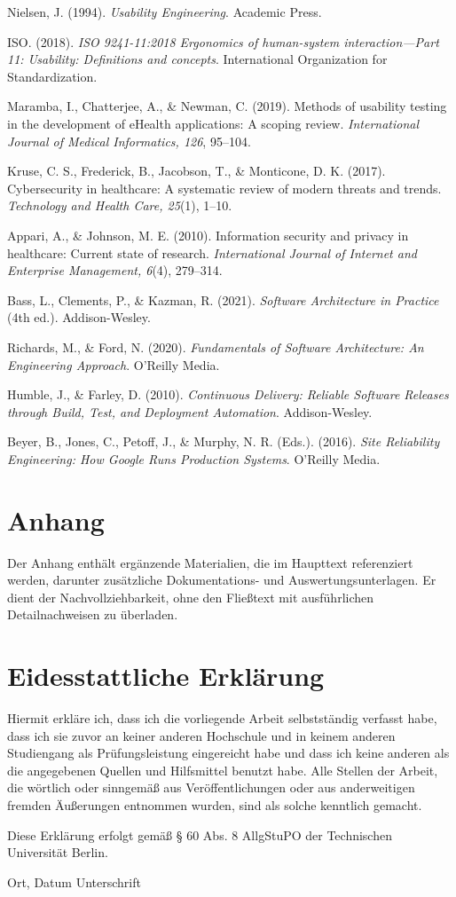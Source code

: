 Nielsen, J. (1994). \emph{Usability Engineering}. Academic Press.

ISO. (2018). \emph{ISO 9241-11:2018 Ergonomics of human-system
interaction---Part 11: Usability: Definitions and concepts}. International
Organization for Standardization.

Maramba, I., Chatterjee, A., \& Newman, C. (2019). Methods of usability
testing in the development of eHealth applications: A scoping review.
\emph{International Journal of Medical Informatics, 126}, 95--104.

Kruse, C. S., Frederick, B., Jacobson, T., \& Monticone, D. K. (2017).
Cybersecurity in healthcare: A systematic review of modern threats and
trends. \emph{Technology and Health Care, 25}(1), 1--10.

Appari, A., \& Johnson, M. E. (2010). Information security and privacy in
healthcare: Current state of research. \emph{International Journal of
Internet and Enterprise Management, 6}(4), 279--314.

Bass, L., Clements, P., \& Kazman, R. (2021). \emph{Software Architecture
in Practice} (4th ed.). Addison-Wesley.

Richards, M., \& Ford, N. (2020). \emph{Fundamentals of Software
Architecture: An Engineering Approach}. O'Reilly Media.

Humble, J., \& Farley, D. (2010). \emph{Continuous Delivery: Reliable
Software Releases through Build, Test, and Deployment Automation}.
Addison-Wesley.

Beyer, B., Jones, C., Petoff, J., \& Murphy, N. R. (Eds.). (2016).
\emph{Site Reliability Engineering: How Google Runs Production Systems}.
O'Reilly Media.

\chapter{Anhang}

Der Anhang enthält ergänzende Materialien, die im Haupttext referenziert
werden, darunter zusätzliche Dokumentations- und Auswertungsunterlagen.
Er dient der Nachvollziehbarkeit, ohne den Fließtext mit ausführlichen
Detailnachweisen zu überladen.

\chapter*{Eidesstattliche Erklärung}

Hiermit erkläre ich, dass ich die vorliegende Arbeit selbstständig
verfasst habe, dass ich sie zuvor an keiner anderen Hochschule und in
keinem anderen Studiengang als Prüfungsleistung eingereicht habe und
dass ich keine anderen als die angegebenen Quellen und Hilfsmittel
benutzt habe. Alle Stellen der Arbeit, die wörtlich oder sinngemäß aus
Veröffentlichungen oder aus anderweitigen fremden Äußerungen entnommen
wurden, sind als solche kenntlich gemacht.

Diese Erklärung erfolgt gemäß § 60 Abs. 8 AllgStuPO der Technischen
Universität Berlin.

Ort, Datum Unterschrift

